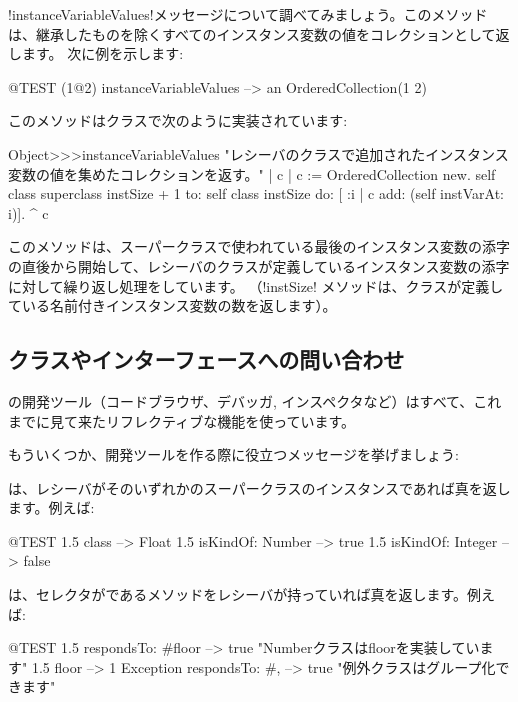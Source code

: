 \documentclass[a4paper,10pt,twoside]{book}
\begin{document}
\ct!instanceVariableValues!メッセージについて調べてみましょう。このメソッドは、継承したものを除くすべてのインスタンス変数の値をコレクションとして返します。
次に例を示します:
\begin{code}{@TEST}
(1@2) instanceVariableValues --> an OrderedCollection(1 2)
\end{code}

このメソッドはクラスで次のように実装されています:
\begin{code}{}
Object>>>instanceVariableValues
	"レシーバのクラスで追加されたインスタンス変数の値を集めたコレクションを返す。"	
	| c |
	c := OrderedCollection new.
	self class superclass instSize + 1
		to: self class instSize
		do: [ :i | c add: (self instVarAt: i)].
	^ c
\end{code}

このメソッドは、スーパークラスで使われている最後のインスタンス変数の添字の直後から開始して、レシーバのクラスが定義しているインスタンス変数の添字に対して繰り返し処理をしています。
（\ct!instSize! メソッドは、クラスが定義している名前付きインスタンス変数の数を返します）。

\subsection{クラスやインターフェースへの問い合わせ}

\pharo の開発ツール（コードブラウザ、デバッガ, インスペクタなど）はすべて、これまでに見て来たリフレクティブな機能を使っています。

もういくつか、開発ツールを作る際に役立つメッセージを挙げましょう:

は、レシーバがそのいずれかのスーパークラスのインスタンスであれば真を返します。例えば:
\begin{code}{@TEST}
1.5 class                     --> Float
1.5 isKindOf: Number --> true
1.5 isKindOf: Integer   --> false
\end{code}

は、セレクタがであるメソッドをレシーバが持っていれば真を返します。例えば:
\begin{code}{@TEST}
1.5 respondsTo: #floor      --> true    "Numberクラスはfloorを実装しています"
1.5 floor                            --> 1
Exception respondsTo: #, --> true    "例外クラスはグループ化できます"
\end{code}
\end{document}
